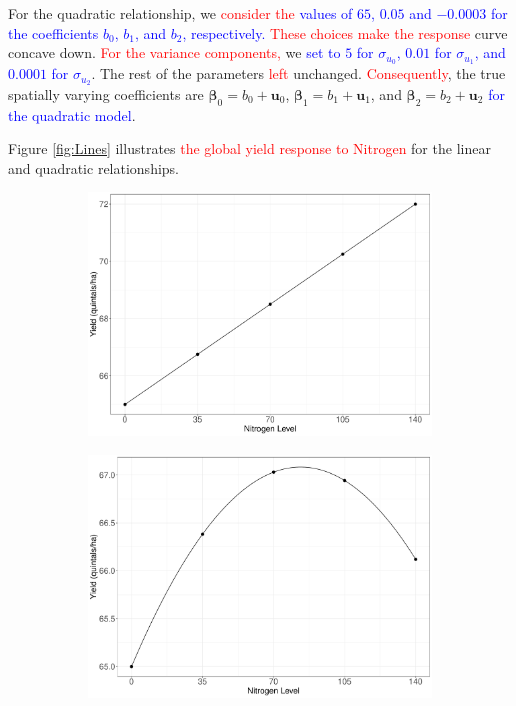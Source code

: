 \documentclass[a4paper]{article} 	%
\newcommand{\revision}[1]{\textcolor{red}{#1}}
\newcommand{\zc}[1]{\textcolor{blue}{#1}}
\begin{document}
For the quadratic relationship, we \revision{consider the} \zc{values of $65$, $0.05$ and $-0.0003$ for the coefficients $b_0$, $b_1$, and $b_2$, respectively.} \revision{These choices make the response} curve concave down. \revision{For the variance components,} we \zc{set to $5$ for $\sigma_{u_0}$, $0.01$ for $\sigma_{u_1}$, and $0.0001$ for $\sigma_{u_2}$}. The rest of the parameters \revision{left} unchanged. \revision{Consequently}, the true spatially varying coefficients are $\bm{\beta}_0 = b_0 + \bm{u}_0$, $\bm{\beta}_1 = b_1 + \bm{u}_1$, and $\bm{\beta}_2 = b_2 + \bm{u}_2$ \zc{for the quadratic model}. 

Figure \ref{fig:Lines} illustrates \revision{the global yield response to Nitrogen} for the linear and quadratic relationships.
\begin{figure}[H]
	\begin{subfigure}[t]{0.45\textwidth}
		\centering
		\includegraphics[width=\linewidth]{Expt/LinlinesV2.pdf}
        \end{subfigure}
	\hspace{0.05\textwidth}
	\begin{subfigure}[t]{0.45\textwidth}
		\centering
		\includegraphics[width=\linewidth]{Expt/QualinesV2.pdf}

\end{subfigure}
\end{figure}
\end{document}
